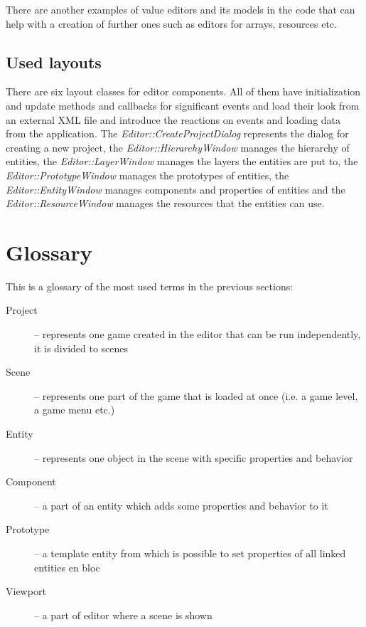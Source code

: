 There are another examples of value editors and its models in the code that can help with a creation of further ones such as editors for arrays, resources etc.

\subsection{Used layouts}

There are six layout classes for editor components. All of them have initialization and update methods and callbacks for significant events and load their look from an external XML file and introduce the reactions on events and loading data from the application. The \emph{Editor::Create\-Project\-Dialog} represents the dialog for creating a new project, the \emph{Editor\-::\-Hierarchy\-Window} manages the hierarchy of entities, the \emph{Editor\-::\-Layer\-Window} manages the layers the entities are put to, the \emph{Editor\-::\-Prototype\-Window} manages the prototypes of entities, the \emph{Editor\-::\-Entity\-Window} manages components and properties of entities and the \emph{Editor\-::\-Resource\-Window} manages the resources that the entities can use.

\section{Glossary}
This is a glossary of the most used terms in the previous sections:

\begin{description}
  \item[Project] -- represents one game created in the editor that can be run independently, it is divided to scenes
  \item[Scene] -- represents one part of the game that is loaded at once (i.e. a game level, a game menu etc.)
  \item[Entity] -- represents one object in the scene with specific properties and behavior
  \item[Component] -- a part of an entity which adds some properties and behavior to it
  \item[Prototype] -- a template entity from which is possible to set properties of all linked entities en bloc
  \item[Viewport] -- a part of editor where a scene is shown
\end{description}